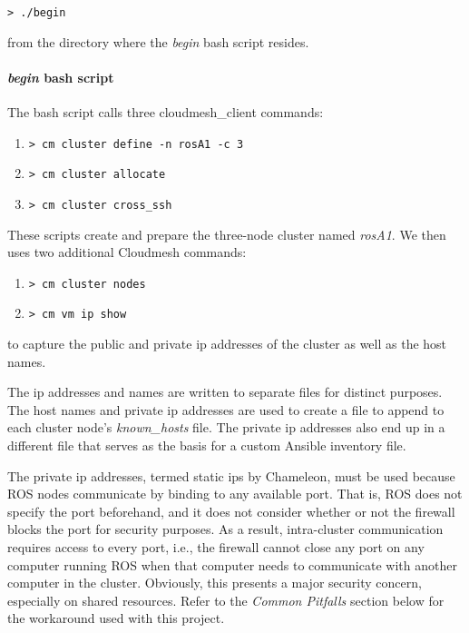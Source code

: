 \documentclass[9pt,twocolumn,twoside]{../../styles/osajnl}
\begin{document}
{\lstinline[style=BashInputStyle]!> ./begin! }

\parindent0pt from the directory where the \textit{begin} bash script resides.  

\paragraph{\textit{begin} bash script}
The bash script calls three cloudmesh\_client commands: 

\begin{enumerate}
\setlength\itemsep{-6pt}
\item {\lstinline[style=BashInputStyle]!> cm cluster define -n rosA1 -c 3! }
\item {\lstinline[style=BashInputStyle]!> cm cluster allocate! } 
\item {\lstinline[style=BashInputStyle]!> cm cluster cross_ssh! } 
\end{enumerate}

These scripts create and prepare the three-node cluster named \textit{rosA1}.  
We then uses two additional Cloudmesh commands:

\begin{enumerate}
\setlength\itemsep{-6pt}
\item  {\lstinline[style=BashInputStyle]!> cm cluster nodes! } 
\item  {\lstinline[style=BashInputStyle]!> cm vm ip show! } 
\end{enumerate}

to capture the public and private ip addresses of the cluster as well as the host names.  

The ip addresses and names are written to separate files for distinct purposes.  The host names and private ip addresses are used to create a file to append to each cluster node's \textit{known\_hosts} file.  The private ip addresses also end up in a different file that serves as the basis for a custom Ansible inventory file.  

The private ip addresses, termed static ips by Chameleon, must be used because ROS nodes communicate by binding to any available port.  That is, ROS does not specify the port beforehand, and it does not consider whether or not the firewall blocks the port for security purposes.  As a result, intra-cluster communication requires access to every port, i.e., the firewall cannot close any port on any computer running ROS when that computer needs to communicate with another computer in the cluster.  Obviously, this presents a major security concern, especially on shared resources. Refer to the \textit{Common Pitfalls} section below for the workaround used with this project.
\end{document}
